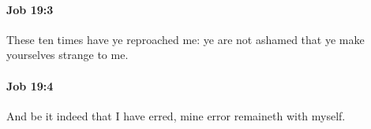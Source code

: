 		\paragraph{Job 19:3} %
			\label{JOB-19-3}

			These ten times have ye reproached me: ye are not ashamed that ye make yourselves strange to me.


		\paragraph{Job 19:4} %
			\label{JOB-19-4}

			And be it indeed that I have erred, mine error remaineth with myself.


